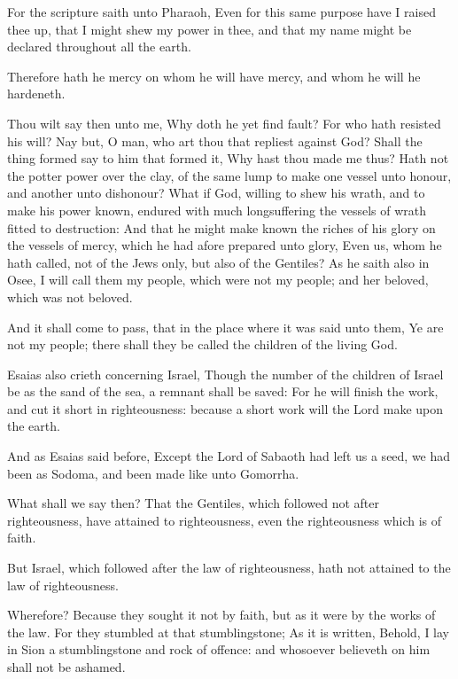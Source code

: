 \Verse For the scripture saith unto Pharaoh, Even for this same purpose have I raised thee up, that I might shew my power in thee, and that my name might be declared throughout all the earth.

\Verse Therefore hath he mercy on whom he will have mercy, and whom he will he hardeneth.

\Verse Thou wilt say then unto me, Why doth he yet find fault? For who hath resisted his will?  \Verse Nay but, O man, who art thou that repliest against God? Shall the thing formed say to him that formed it, Why hast thou made me thus?  \Verse Hath not the potter power over the clay, of the same lump to make one vessel unto honour, and another unto dishonour?  \Verse What if God, willing to shew his wrath, and to make his power known, endured with much longsuffering the vessels of wrath fitted to destruction: \Verse And that he might make known the riches of his glory on the vessels of mercy, which he had afore prepared unto glory, \Verse Even us, whom he hath called, not of the Jews only, but also of the Gentiles?  \Verse As he saith also in Osee, I will call them my people, which were not my people; and her beloved, which was not beloved.

\Verse And it shall come to pass, that in the place where it was said unto them, Ye are not my people; there shall they be called the children of the living God.

\Verse Esaias also crieth concerning Israel, Though the number of the children of Israel be as the sand of the sea, a remnant shall be saved: \Verse For he will finish the work, and cut it short in righteousness: because a short work will the Lord make upon the earth.

\Verse And as Esaias said before, Except the Lord of Sabaoth had left us a seed, we had been as Sodoma, and been made like unto Gomorrha.

\Verse What shall we say then? That the Gentiles, which followed not after righteousness, have attained to righteousness, even the righteousness which is of faith.

\Verse But Israel, which followed after the law of righteousness, hath not attained to the law of righteousness.

\Verse Wherefore? Because they sought it not by faith, but as it were by the works of the law. For they stumbled at that stumblingstone; \Verse As it is written, Behold, I lay in Sion a stumblingstone and rock of offence: and whosoever believeth on him shall not be ashamed.


